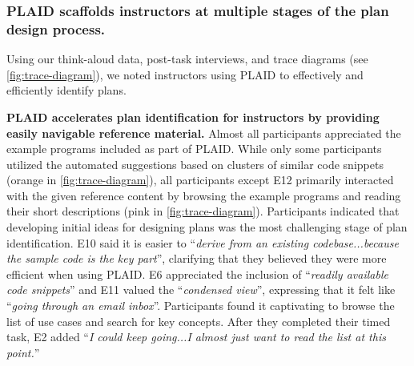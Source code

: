 \subsubsection{PLAID scaffolds instructors at multiple stages of the plan design process.}

Using our think-aloud data, post-task interviews, and trace diagrams (see \cref{fig:trace-diagram}), we noted instructors using PLAID to effectively and efficiently identify plans. 

\textbf{PLAID accelerates plan identification for instructors by providing easily navigable reference material.}
Almost all participants appreciated the example programs included as part of PLAID.
While only some participants utilized the automated suggestions based on clusters of similar code snippets (orange in \cref{fig:trace-diagram}), all participants except E12 primarily interacted with the given reference content by browsing the example programs 
and reading their short descriptions 
(pink in \cref{fig:trace-diagram}). 
Participants indicated that developing initial ideas for designing plans was the most challenging stage of plan identification. E10 said it is easier to ``\textit{derive from an existing codebase...because the sample code is the key part}'', clarifying that they believed they were more efficient when using PLAID. 
E6 appreciated the inclusion of ``\textit{readily available code snippets}'' and E11 valued the ``\textit{condensed view}'', expressing that it felt like ``\textit{going through an email inbox}''. 
Participants found it captivating to browse the list of use cases and search for key concepts. 
After they completed their timed task, E2 added ``\textit{I could keep going...I almost just want to read the list at this point.}'' 

